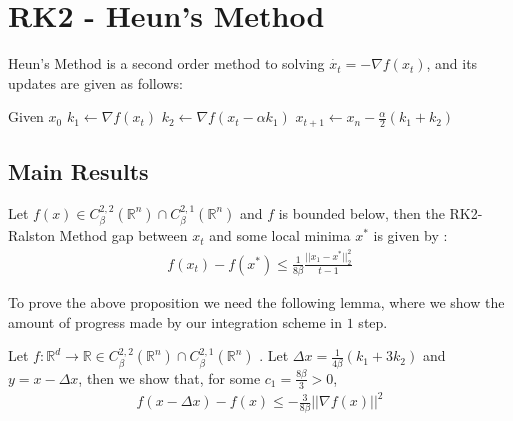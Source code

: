 \section{RK2 - Heun's Method}
Heun's Method is a second order method to solving $\dot{x_t} = - \nabla f(x_t)$, and its updates are given as follows:
\begin{algorithmic}
\STATE Given $x_0$
  \STATE $k_1 \gets \nabla f(x_t)$
  \STATE $k_2 \gets \nabla f(x_t - \alpha k_1) $
  \STATE $x_{t+1} \gets x_n - \frac{\alpha}{2}(k_1 + k_2)$
\ENDFOR
\end{algorithmic}
\subsection{Main Results}
\begin{thm} Let $f(x) \in C_{\beta}^{2,2}( \mathbb{R}^n) \cap  C_{\beta}^{2,1}( \mathbb{R}^n)$ and $f$ is bounded below, then the RK2-Ralston Method gap between $x_t$ and some local minima $x^*$ is given by :
\begin{align*}
f(x_t) - f(x^*) \leq \frac{1}{8 \beta} \frac{ || x_1 - x^* ||_2^2}{t-1}
\end{align*}
\end{thm}
To prove the above proposition we need the following lemma, where we show the amount of progress made by our integration scheme in $1$ step.
\begin{lemma}
Let $f : \mathbb{R}^d \rightarrow \mathbb{R} \in C_{\beta}^{2,2}( \mathbb{R}^n) \cap  C_{\beta}^{2,1}( \mathbb{R}^n) $  . Let $\Delta x =  \frac{1}{4\beta}(k_1 + 3k_2)$ and $ y  = x - \Delta x$, then  we show that, for some $c_1= \frac{8\beta}{3} >0 $,
\begin{align}
f(x - \Delta x ) - f(x) \leq - \frac{3}{8 \beta} || \nabla f(x) ||^2
\end{align}
\end{lemma}


